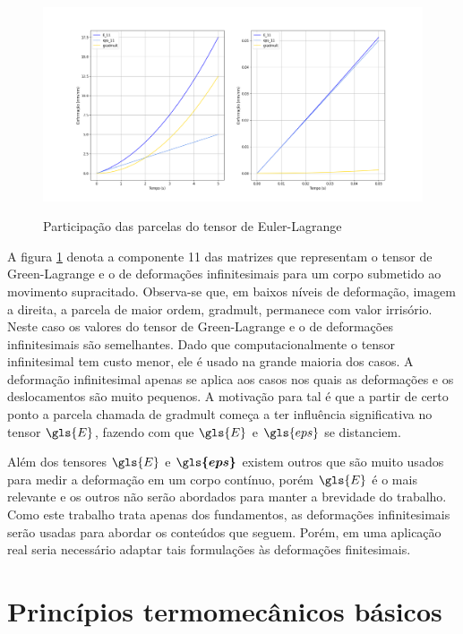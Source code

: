 \begin{figure}[H]
\caption{Participação das parcelas do tensor de Euler-Lagrange}
\centering
	\includegraphics[width = \textwidth]{images/quest3ex.png}
	\label{fig:gradmult}
\end{figure}

A figura \ref{fig:gradmult} denota a componente 11 das matrizes que representam o tensor de Green-Lagrange e o de deformações infinitesimais para um corpo submetido ao movimento supracitado. Observa-se que, em baixos níveis de deformação, imagem a direita, a parcela de maior ordem, gradmult, permanece com valor irrisório. Neste caso os valores do tensor de Green-Lagrange e o de deformações infinitesimais são semelhantes. Dado que computacionalmente o tensor infinitesimal tem custo menor, ele é usado na grande maioria dos casos. A deformação infinitesimal apenas se aplica aos casos nos quais as deformações e os deslocamentos são muito pequenos. A motivação para tal é que a partir de certo ponto a parcela chamada de gradmult começa a ter influência significativa no tensor $ \gls{E} $, fazendo com que $ \gls{E} $ e $ \gls{eps} $ se distanciem. \par

Além dos tensores $ \gls{E} $ e $ \boldsymbol{\gls{eps}} $ existem outros que são muito usados para medir a deformação em um corpo contínuo, porém $\gls{E}$ é o mais relevante e os outros não serão abordados para manter a brevidade do trabalho. \\

Como este trabalho trata apenas dos fundamentos, as deformações infinitesimais serão usadas para abordar os conteúdos que seguem. Porém, em uma aplicação real seria necessário adaptar tais formulações às deformações finitesimais.

\section{Princípios termomecânicos básicos}

